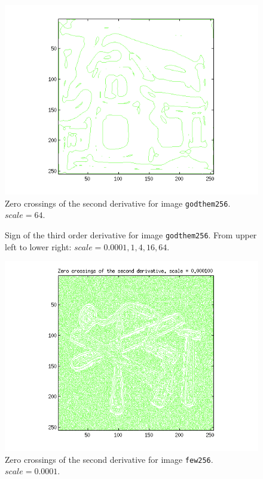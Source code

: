 \begin{figure}[H]
	\centering
	\includegraphics[scale=0.8]{./images/Q4/vv/64.png}
	\caption{Zero crossings of the second derivative for image \texttt{godthem256}. $scale = 64$.}
	\label{fig:Q4_vv_64}
\end{figure}


\begin{figure}[H]
	\centering
	\scalebox{0.6}{}
	\caption{Sign of the third order derivative for image \texttt{godthem256}. From upper left to lower right: $scale = 0.0001, 1, 4, 16, 64$.}
	\label{fig:Q4_vvv_}
\end{figure}



\begin{figure}[H]
	\centering
	\includegraphics[scale=0.8]{./images/Q5/vv/0.0001.png}
	\caption{Zero crossings of the second derivative for image \texttt{few256}. $scale = 0.0001$.}
	\label{fig:Q5_vv_0.0001}
\end{figure}

